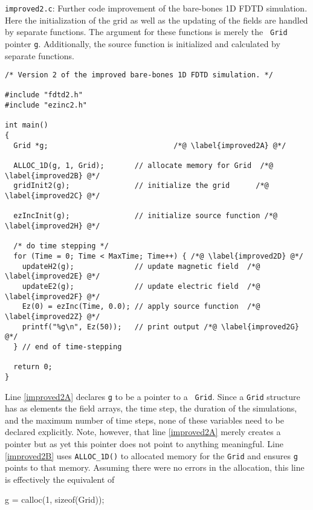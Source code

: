 \begin{program} {\tt improved2.c}: Further code improvement of the
  bare-bones 1D FDTD simulation.  Here the initialization of the grid
  as well as the updating of the fields are handled by separate
  functions.  The argument for these functions is merely the {\tt
    Grid} pointer {\tt g}.  Additionally, the source function is
  initialized and calculated by separate
  functions. \label{pro:improved2} \codemiddle
\begin{lstlisting}
/* Version 2 of the improved bare-bones 1D FDTD simulation. */

#include "fdtd2.h"
#include "ezinc2.h"

int main()
{
  Grid *g;                             /*@ \label{improved2A} @*/

  ALLOC_1D(g, 1, Grid);       // allocate memory for Grid  /*@ \label{improved2B} @*/
  gridInit2(g);               // initialize the grid      /*@ \label{improved2C} @*/

  ezIncInit(g);               // initialize source function /*@ \label{improved2H} @*/

  /* do time stepping */
  for (Time = 0; Time < MaxTime; Time++) { /*@ \label{improved2D} @*/
    updateH2(g);              // update magnetic field  /*@ \label{improved2E} @*/
    updateE2(g);              // update electric field  /*@ \label{improved2F} @*/
    Ez(0) = ezInc(Time, 0.0); // apply source function  /*@ \label{improved2Z} @*/
    printf("%g\n", Ez(50));   // print output /*@ \label{improved2G} @*/
  } // end of time-stepping

  return 0;
}
\end{lstlisting}
\end{program}

Line \ref{improved2A} declares {\tt g} to be a pointer to a {\tt
  Grid}.  Since a {\tt Grid} structure has as elements the field
arrays, the time step, the duration of the simulations, and the
maximum number of time steps, none of these variables need to be
declared explicitly.  Note, however, that line \ref{improved2A} merely
creates a pointer but as yet this pointer does not point to anything
meaningful.  Line \ref{improved2B} uses {\tt ALLOC\_1D()} to allocated
memory for the {\tt Grid} and ensures {\tt g} points to that memory.
Assuming there were no errors in the allocation, this line is
effectively the equivalent of
\begin{code}
  g = calloc(1, sizeof(Grid));
\end{code}

